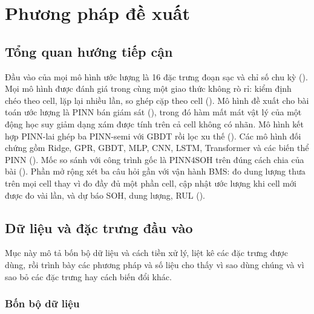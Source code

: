 \chapter{Phương pháp đề xuất}
\label{chap:methodology}

\section{Tổng quan hướng tiếp cận}\label{sec:tongquan}

Đầu vào của mọi mô hình ước lượng là 16 đặc trưng đoạn sạc và chỉ số chu kỳ (). Mọi mô hình được đánh
giá trong cùng một giao thức không rò rỉ: kiểm định chéo theo cell, lặp lại nhiều lần, so ghép cặp theo cell
(). Mô hình đề xuất cho bài toán ước lượng là PINN bán giám sát (), trong đó hàm mất
mát vật lý của một động học suy giảm dạng xám được tính trên cả cell không có nhãn. Mô hình kết hợp PINN-lai ghép ba
PINN-semi với GBDT rồi lọc xu thế (). Các mô hình đối chứng gồm Ridge, GPR, GBDT, MLP, CNN, LSTM,
Transformer và các biến thể PINN (). Mốc so sánh với công trình gốc là PINN4SOH trên đúng cách chia
của bài (). Phần mở rộng xét ba câu hỏi gần với vận hành BMS: đo dung lượng thưa trên mọi cell thay vì
đo đầy đủ một phần cell, cập nhật ước lượng khi cell mới được đo vài lần, và dự báo SOH, dung lượng, RUL
().

\section{Dữ liệu và đặc trưng đầu vào}\label{ch:dactrung}

Mục này mô tả bốn bộ dữ liệu và cách tiền xử lý, liệt kê các đặc trưng được dùng, rồi trình bày các phương pháp và số
liệu cho thấy vì sao dùng chúng và vì sao bỏ các đặc trưng hay cách biến đổi khác.

\subsection{Bốn bộ dữ liệu}\label{sec:data}

